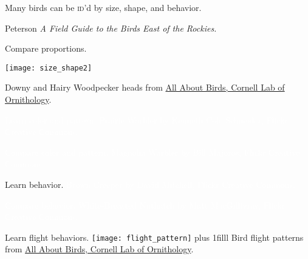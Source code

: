 \documentclass[t]{beamer}
\begin{document}
{
\begin{frame}[t,plain]{Many birds can be \textsc{id}'d by size, shape, and behavior.}

	\vfilll
	
	\tiny\hfill{Peterson \textit{A Field Guide to the Birds East of the Rockies.}}
\end{frame}
}

\begin{frame}[b,plain]{Compare proportions.}
	\begin{center}
		\texttt{[image: size\_shape2]}
	\end{center}
	\tiny Downy and Hairy Woodpecker heads from \href{http://allaboutbirds.com}{All About Birds, Cornell Lab of Ornithology}.
\end{frame}


{
\begin{frame}[b,plain]{\hfill\textcolor{white}{Learn color and pattern.}}
	\tiny\textcolor{white}{Prairie Warbler by Kenneth Cole Schneider, Flickr Creative Commons.}
\end{frame}
}

{
\begin{frame}[b,plain]{\hfill\textcolor{white}{Compare color and pattern.}}
	\tiny\textcolor{white}{Magnolia Warbler by Bill Majoros, Flickr Creative Commons.}
\end{frame}
}

{
\begin{frame}[b,plain]{Learn behavior.}
	\tiny\hfill\textcolor{white}{Brown Creeper by David Mitchell, Flickr Creative Commons.}
\end{frame}
}

{
\begin{frame}[b,plain]{\hfill\textcolor{white}{Compare behavior.}}
	\tiny\textcolor{white}{White-Breasted Nuthatch by Matt MacGillivray, Flickr Creative Commons.}
\end{frame}
}

{
\begin{frame}[c,plain]{Learn flight behaviors.}
	\texttt{[image: flight\_pattern]}
\vskip0pt plus 1filll	
	\hfill\tiny Bird flight patterns from \href{http://allaboutbirds.com}{All About Birds, Cornell Lab of Ornithology}.
\end{frame}
}
\end{document}
